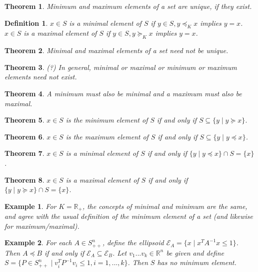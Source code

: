\documentclass[a4paper]{article}
\newtheorem{mytheorem}{Theorem}
\newtheorem{example}{Example}
\newtheorem{mydef}{Definition}
\numberwithin{mytheorem}{section}
\numberwithin{mydef}{section}
\numberwithin{example}{section}
\begin{document}
\begin{mytheorem} Minimum and maximum elements of a set are unique, if they exist. \end{mytheorem}

\begin{mydef} $x \in S$ is a minimal element of $S$ if $y \in S, y \preceq_{K} x$ implies $y = x$. $x \in S$ is a maximal element of $S$ if $y \in S, y \succeq_{K} x$ implies $y = x$.\end{mydef}

\begin{mytheorem} Minimal and maximal elements of a set need not be unique. \end{mytheorem}

\begin{mytheorem} (?) In general, minimal or maximal or minimum or maximum elements need not exist. \end{mytheorem}

\begin{mytheorem} A minimum must also be minimal and a maximum must also be maximal. \end{mytheorem}

\begin{mytheorem} $x \in S$ is the minimum element of $S$ if and only if $S \subseteq \{ y \mid y \succeq x \}$.  \end{mytheorem}

\begin{mytheorem} $x \in S$ is the maximum element of $S$ if and only if $S \subseteq \{ y \mid y \preceq x \}$.  \end{mytheorem}

\begin{mytheorem} $x \in S$ is a minimal element of $S$ if and only if $\{ y \mid y \preceq x \} \cap S = \{ x \} $.  \end{mytheorem}

\begin{mytheorem} $x \in S$ is a maximal element of $S$ if and only if $\{ y \mid y \succeq x \} \cap S = \{ x \} $.  \end{mytheorem}

\begin{example} For $K = \mathbb{R}_{+}$, the concepts of minimal and minimum are the same, and agree with the usual definition of the minimum element of a set (and likewise for maximum/maximal).
\end{example}

\begin{example} For each $A \in S^{n}_{++}$, define the ellipsoid $\mathcal{E}_{A} = \{ x \mid x^{T}A^{-1}x \leq 1 \}$. Then $A \preceq B$ if and only if $\mathcal{E}_{A} \subseteq \mathcal{E}_{B}$. Let $v_{1}...v_{k} \in \mathbb{R}^{n}$ be given and define $S = \{ P \in S^{n}_{++} \mid v^{T}_{i}P^{-1}v_{i} \leq 1, i = 1,...,k\}$. Then $S$ has no minimum element.
\end{example}
\end{document}
